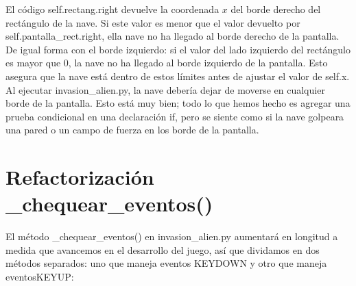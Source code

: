 El código {\ttfamily self.rectang.right} devuelve la coordenada $x$ del borde derecho del rectángulo de la nave. 
Si este valor es menor que el valor devuelto por {\ttfamily self.pantalla\_rect.right}, ella nave no ha llegado al borde derecho de la pantalla.  De igual forma con el borde izquierdo: si el valor del lado izquierdo del rectángulo es mayor que 0,
la  nave no ha llegado al borde izquierdo de la pantalla. Esto asegura que la nave está dentro de estos límites antes de 
ajustar el valor de {\ttfamily self.x}.\\


Al ejecutar  {\ttfamily invasion\_alien.py}, la nave debería dejar de moverse en cualquier borde de la pantalla. 
Esto está muy bien; todo lo que hemos hecho es agregar una prueba condicional en una declaración {\ttfamily if}, 
pero se siente como si la nave golpeara una pared o un campo de fuerza en los borde de la pantalla.


\section{Refactorización \_chequear\_eventos()}


El método {\ttfamily \_chequear\_eventos()}  en  {\ttfamily invasion\_alien.py} aumentará en longitud a medida que avancemos en el desarrollo del juego,  así que dividamos  en dos métodos separados: uno que maneja eventos {\ttfamily KEYDOWN} y otro que maneja eventos{\ttfamily KEYUP}:


\hspace{-2.4cm}{\ttfamily \scriptsize invasión}

